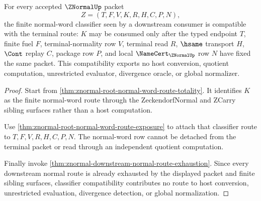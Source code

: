 \begin{theorem}
\label{thm:znormal-finite-normalword-classifier-compatibility}
For every accepted $\ZNormalUp$ packet
$$
Z=(T,F,V,K,R,H,C,P,N),
$$
the finite normal-word classifier seen by a downstream consumer is compatible with the terminal route: $K$ may be consumed only after the typed endpoint $T$, finite fuel $F$, terminal-normality row $V$, terminal read $R$, $\hsame$ transport $H$, $\Cont$ replay $C$, package row $P$, and local $\NameCert_{\ZNormalUp}$ row $N$ have fixed the same packet. This compatibility exports no host conversion, quotient computation, unrestricted evaluator, divergence oracle, or global normalizer.
\end{theorem}
\begin{proof}
Start from \autoref{thm:znormal-root-normal-word-route-totality}. It identifies $K$ as the finite normal-word route through the ZeckendorfNormal and ZCarry sibling surfaces rather than a host computation.

Use \autoref{thm:znormal-root-normal-word-route-exposure} to attach that classifier route to $T,F,V,R,H,C,P,N$. The normal-word row cannot be detached from the terminal packet or read through an independent quotient computation.

Finally invoke \autoref{thm:znormal-downstream-normal-route-exhaustion}. Since every downstream normal route is already exhausted by the displayed packet and finite sibling surfaces, classifier compatibility contributes no route to host conversion, unrestricted evaluation, divergence detection, or global normalization.
\end{proof}

